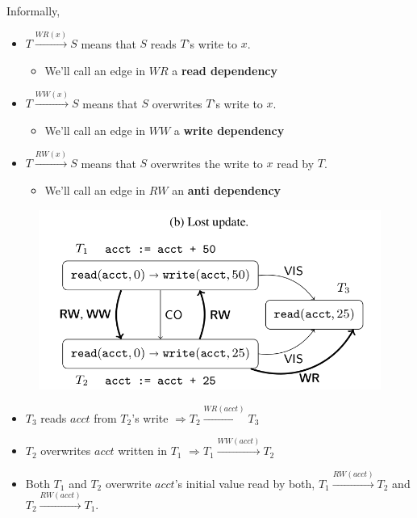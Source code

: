 \documentclass{beamer}
\begin{document}
\begin{frame}
	Informally,
	\begin{itemize}
		\item $T \xrightarrow{WR(x)} S $ means that $S$ reads $T$'s write to $x$.
		\begin{itemize}
			\item We'll call an edge in $WR$ a \textbf{read dependency}
		\end{itemize}
		\item $T \xrightarrow{WW(x)} S $ means that $S$ overwrites $T$'s write to $x$.
				\begin{itemize}
			\item We'll call an edge in $WW$ a \textbf{write dependency}
		\end{itemize}
		\item $T \xrightarrow{RW(x)} S $ means that $S$ overwrites the write to $x$ read by $T$.
		\begin{itemize}
			\item We'll call an edge in $RW$ an \textbf{anti dependency}
		\end{itemize}
	\end{itemize}
\end{frame}


\begin{frame}
	\begin{figure}
		\includegraphics[scale=0.3]{fig2b}
	\end{figure}
	\begin{example}
		\begin{itemize}
			\item $T_3$ reads $acct$ from $T_2$'s write $\Rightarrow T_2 \xrightarrow{WR(acct)} T_3$
			\item $T_2$ overwrites $acct$ written in $T_1$ $\Rightarrow T_1 \xrightarrow{WW(acct)} T_2$
			\item Both $T_1$ and $T_2$ overwrite $acct$'s initial value read by both, $T_1 \xrightarrow{RW(acct)} T_2$ and $T_2 \xrightarrow{RW(acct)} T_1$.
		\end{itemize}
	\end{example}
\end{frame}
\end{document}
